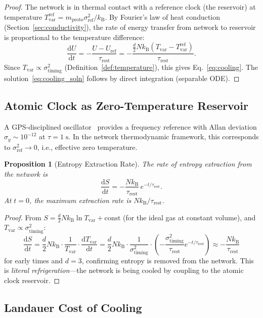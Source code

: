 \documentclass[11pt,twocolumn,a4paper]{article}
\newtheorem{proposition}[theorem]{Proposition}
\theoremstyle{definition}
\theoremstyle{remark}
\newcommand{\kB}{k_{\mathrm{B}}}
\newcommand{\Tvar}{T_{\mathrm{var}}}
\newcommand{\mpr}{m_{\mathrm{proto}}}
\newcommand{\sigtime}{\sigma^{2}_{\mathrm{timing}}}
\newcommand{\trest}{\tau_{\mathrm{rest}}}
\newcommand{\dd}{\mathrm{d}}
\begin{document}
\begin{proof}
The network is in thermal contact with a reference clock (the reservoir) at
temperature $\Tvar^{\mathrm{ref}}=\mpr\sigma^2_{\mathrm{ref}}/\kB$.
By Fourier's law of heat conduction (Section~\ref{sec:conductivity}),
the rate of energy transfer from network to reservoir is proportional to the
temperature difference:
\[
  \frac{\dd U}{\dd t} = -\frac{U-U_{\mathrm{ref}}}{\trest}
  = -\frac{\frac{d}{2}N\kB(\Tvar-\Tvar^{\mathrm{ref}})}{\trest}.
\]
Since $\Tvar\propto\sigtime$ (Definition~\ref{def:temperature}), this gives
Eq.~\eqref{eq:cooling}.  The solution~\eqref{eq:cooling_soln} follows by
direct integration (separable ODE).
\end{proof}

\subsection{Atomic Clock as Zero-Temperature Reservoir}\label{sec:atomic}

A GPS-disciplined oscillator~\cite{Mills1991} provides a frequency reference
with Allan deviation $\sigma_y\sim 10^{-12}$ at $\tau=1\;\mathrm{s}$.
In the network thermodynamic framework, this corresponds to
$\sigma^2_{\mathrm{ref}}\to 0$, i.e., effective zero temperature.

\begin{proposition}[Entropy Extraction Rate]\label{prop:entropy_rate}
The rate of entropy extraction from the network is
\begin{equation}\label{eq:entropy_rate}
  \frac{\dd S}{\dd t} = -\frac{N\kB}{\trest}\,e^{-t/\trest}.
\end{equation}
At $t=0$, the maximum extraction rate is $N\kB/\trest$.
\end{proposition}

\begin{proof}
From $S=\frac{d}{2}N\kB\ln\Tvar+\text{const}$ (for the ideal gas at
constant volume), and $\Tvar\propto\sigtime$:
\[
  \frac{\dd S}{\dd t} = \frac{d}{2}N\kB\cdot\frac{1}{\Tvar}
  \cdot\frac{\dd\Tvar}{\dd t}
  = \frac{d}{2}N\kB\cdot\frac{1}{\sigtime}\cdot
  \left(-\frac{\sigtime}{\trest}e^{-t/\trest}\right)
  \approx -\frac{N\kB}{\trest}
\]
for early times and $d=3$, confirming entropy is removed from the network.
This is \emph{literal refrigeration}---the network is being cooled by
coupling to the atomic clock reservoir.
\end{proof}

\subsection{Landauer Cost of Cooling}\label{sec:landauer}
\end{document}

